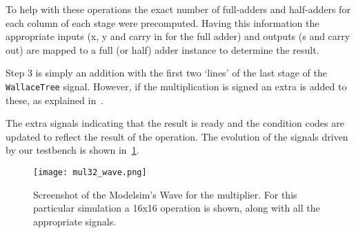 To help with these operations the exact number of full-adders and half-adders for each column of each stage were precomputed.
Having this information the appropriate inputs (x, y and carry in for the full adder) and outputs (s and carry out) are mapped to a full (or half) adder instance to determine the result.

Step 3 is simply an addition with the first two `lines' of the last stage of the \texttt{WallaceTree} signal. However, if the multiplication is signed an extra \STDV is added to these, as explained in~\cite{part3}.

The extra signals indicating that the result is ready and the condition codes are updated to reflect the result of the operation.  
The evolution of the signals driven by our testbench is shown in~\ref{fig:mul32_wave}.


\begin{figure}[H]
\centering
\texttt{[image: mul32\_wave.png]}
\caption{Screenshot of the Modelsim's Wave for the multiplier. For this particular simulation a 16x16 operation is shown, along with all the appropriate signals.}
\label{fig:mul32_wave}
\end{figure}